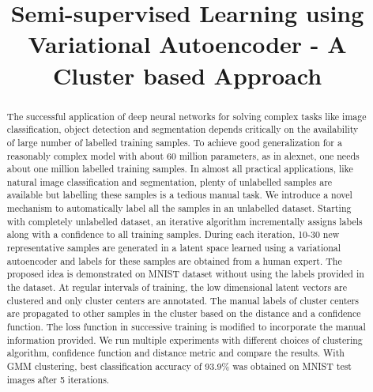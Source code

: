 \documentclass{bmvc2k}
\title{Semi-supervised Learning using Variational Autoencoder - A Cluster based Approach}
\begin{document}
\maketitle

\begin{abstract}
    The successful application of deep neural networks for solving complex tasks like image classification, object detection and segmentation depends critically on the availability of large number of labelled training samples.
To achieve good generalization for a reasonably complex model with about 60 million parameters, as in alexnet, one needs about one million labelled training samples.
In almost all practical applications, like natural image classification and segmentation,  plenty of unlabelled samples are available but labelling these samples is a tedious manual task.
We introduce a novel mechanism to automatically label all the samples in an unlabelled dataset.
    Starting with completely unlabelled dataset, an iterative algorithm incrementally assigns labels along with a confidence to all training samples.
    During each iteration, 10-30 new representative samples are generated in a latent space learned using a variational autoencoder and labels for these samples are obtained from a human expert.
The proposed  idea  is demonstrated on MNIST dataset without using the labels provided in the dataset.
At regular intervals of training, the low dimensional latent vectors are clustered and only cluster centers are annotated.
    The manual labels of cluster centers are propagated to other samples in the cluster based on the distance and a confidence function.
The loss function in successive training is modified to incorporate the manual information provided.
    We run multiple experiments with different choices of clustering algorithm, confidence function and distance metric and compare the results.
With GMM clustering, best classification accuracy of 93.9\% was obtained on MNIST test images after 5 iterations.
\end{abstract}
\end{document}
